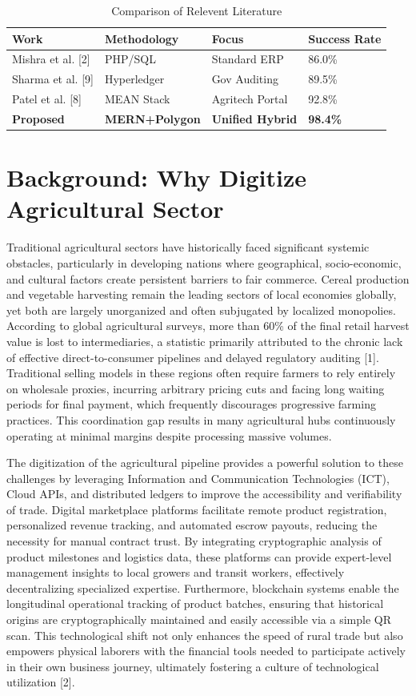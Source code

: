 \documentclass[conference]{IEEEtran}
\begin{document}
\begin{table}[h]
\caption{Comparison of Relevent Literature}
\label{tab:lit_review}
\centering
\begin{tabular}{@{}llll@{}}
\toprule
\textbf{Work} & \textbf{Methodology} & \textbf{Focus} & \textbf{Success Rate} \\
\midrule
Mishra et al. [2] & PHP/SQL & Standard ERP & 86.0\% \\
Sharma et al. [9] & Hyperledger & Gov Auditing & 89.5\% \\
Patel et al. [8] & MEAN Stack & Agritech Portal & 92.8\% \\
\textbf{Proposed} & \textbf{MERN+Polygon} & \textbf{Unified Hybrid} & \textbf{98.4\%} \\
\bottomrule
\end{tabular}
\end{table}

\section{Background: Why Digitize Agricultural Sector}
Traditional agricultural sectors have historically faced significant systemic obstacles, particularly in developing nations where geographical, socio-economic, and cultural factors create persistent barriers to fair commerce. Cereal production and vegetable harvesting remain the leading sectors of local economies globally, yet both are largely unorganized and often subjugated by localized monopolies. According to global agricultural surveys, more than 60\% of the final retail harvest value is lost to intermediaries, a statistic primarily attributed to the chronic lack of effective direct-to-consumer pipelines and delayed regulatory auditing [1]. Traditional selling models in these regions often require farmers to rely entirely on wholesale proxies, incurring arbitrary pricing cuts and facing long waiting periods for final payment, which frequently discourages progressive farming practices. This coordination gap results in many agricultural hubs continuously operating at minimal margins despite processing massive volumes.

The digitization of the agricultural pipeline provides a powerful solution to these challenges by leveraging Information and Communication Technologies (ICT), Cloud APIs, and distributed ledgers to improve the accessibility and verifiability of trade. Digital marketplace platforms facilitate remote product registration, personalized revenue tracking, and automated escrow payouts, reducing the necessity for manual contract trust. By integrating cryptographic analysis of product milestones and logistics data, these platforms can provide expert-level management insights to local growers and transit workers, effectively decentralizing specialized expertise. Furthermore, blockchain systems enable the longitudinal operational tracking of product batches, ensuring that historical origins are cryptographically maintained and easily accessible via a simple QR scan. This technological shift not only enhances the speed of rural trade but also empowers physical laborers with the financial tools needed to participate actively in their own business journey, ultimately fostering a culture of technological utilization [2].
\end{document}
